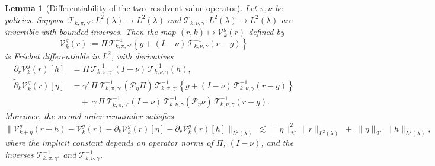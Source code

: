 \documentclass[11pt]{article}
\newcommand{\adk}{\widetilde{\partial}_k}
\theoremstyle{plain}
\newtheorem{lemma}[theorem]{Lemma}
\begin{document}
\begin{lemma}[Differentiability of the two–resolvent value operator]
 \label{lemma::normalizedvaluedifferentiable}
Let $\pi,\nu$ be policies. Suppose $\mathcal{T}_{k,\pi,\gamma'}:L^2(\lambda)\to L^2(\lambda)$ and 
$\mathcal{T}_{k,\nu,\gamma}:L^2(\lambda)\to L^2(\lambda)$ are invertible with bounded inverses. 
Then the map $(r,k) \mapsto \mathcal{V}_k^g(r)$ defined by
\[
\mathcal{V}_k^g(r) := \Pi\,\mathcal{T}_{k,\pi,\gamma'}^{-1}\!\left\{g + (I-\nu)\,\mathcal{T}_{k,\nu,\gamma}^{-1}(r-g)\right\}
\]
is Fréchet differentiable in $L^2$, with derivatives
\begin{align*}
\partial_r \mathcal{V}_k^g(r)[h] 
&= \Pi\,\mathcal{T}_{k,\pi,\gamma'}^{-1}(I-\nu)\,\mathcal{T}_{k,\nu,\gamma}^{-1}(h), \\[6pt]
\adk \mathcal{V}_k^g(r)[\eta]
&= \gamma'\,\Pi\,\mathcal{T}_{k,\pi,\gamma'}^{-1}(\mathcal{P}_\eta \Pi)\,
      \mathcal{T}_{k,\pi,\gamma'}^{-1}\!\left\{g + (I-\nu)\,\mathcal{T}_{k,\nu,\gamma}^{-1}(r-g)\right\} \\
&\quad+\; \gamma\,\Pi\,\mathcal{T}_{k,\pi,\gamma'}^{-1}(I-\nu)\,
      \mathcal{T}_{k,\nu,\gamma}^{-1}(\mathcal{P}_\eta \nu)\,
      \mathcal{T}_{k,\nu,\gamma}^{-1}(r-g).
\end{align*}
Moreover, the second-order remainder satisfies
\[
\|\mathcal V_{k+\eta}^g(r+h)-\mathcal V_{k}^g(r)-\adk\mathcal V_{k}^g(r)[\eta]- \partial_r \mathcal V_{k}^g(r)[h]\|_{L^2(\lambda)}
\;\lesssim\; \|\eta\|_{\mathcal K}^2\,\|r\|_{L^2(\lambda)} \;+\; \|\eta\|_{\mathcal K}\,\|h\|_{L^2(\lambda)},
\]
where the implicit constant depends on operator norms of $\Pi$, $(I-\nu)$, and the inverses 
$\mathcal{T}_{k,\pi,\gamma'}^{-1}$ and $\mathcal{T}_{k,\nu,\gamma}^{-1}$.
\end{lemma}
\end{document}
